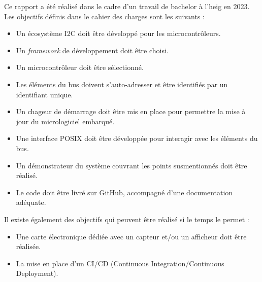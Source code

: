 Ce rapport a été réalisé dans le cadre d'un travail de bachelor à l'\gls{heig} en 2023.
Les objectifs définis dans le cahier des charges sont les suivants :

\begin{itemize}
    \item Un écosystème I2C doit être développé pour les microcontrôleurs.
    \item Un \textit{\gls{framework}} de développement doit être choisi.
    \item Un microcontrôleur doit être sélectionné.
    \item Les éléments du bus doivent s'auto-adresser et être identifiés par un identifiant unique.
    \item Un chageur de démarrage doit être mis en place pour permettre la mise à jour du micrologiciel embarqué.
    \item Une interface POSIX doit être développée pour interagir avec les éléments du bus.
    \item Un démonstrateur du système couvrant les points susmentionnés doit être réalisé.
    \item Le code doit être livré sur GitHub, accompagné d'une documentation adéquate.
\end{itemize}

Il existe également des objectifs qui peuvent être réalisé si le temps le permet :

\begin{itemize}
    \item Une carte électronique dédiée avec un capteur et/ou un afficheur doit être réalisée.
    \item La mise en place d'un CI/CD (Continuous Integration/Continuous Deployment).
\end{itemize}

